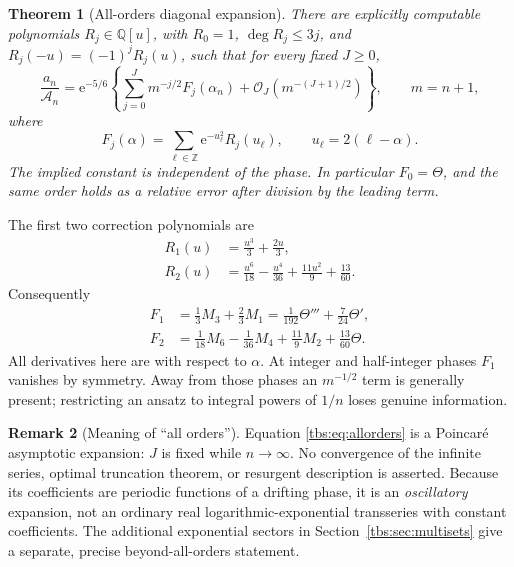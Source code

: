 \documentclass[11pt,a4paper]{article}
\numberwithin{equation}{section}
\newtheorem{theorem}{Theorem}[section]
\theoremstyle{definition}
\newtheorem{remark}[theorem]{Remark}
\newcommand{\Z}{\mathbb Z}
\newcommand{\Acal}{\mathcal A}
\newcommand{\ee}{\mathrm e}
\newcommand{\OO}{\mathcal O}
\begin{document}
\begin{theorem}[All-orders diagonal expansion]\label{tbs:thm:main}
There are explicitly computable polynomials $R_j\in\mathbb Q[u]$, with
$R_0=1$, $\deg R_j\le3j$, and
$R_j(-u)=(-1)^jR_j(u)$, such that for every fixed $J\ge0$,
\begin{equation}\label{tbs:eq:allorders}
 \frac{a_n}{\Acal_n}
 =\ee^{-5/6}\left\{
 \sum_{j=0}^J m^{-j/2}F_j(\alpha_n)
 +\OO_J\!\left(m^{-(J+1)/2}\right)\right\},
 \qquad m=n+1,
\end{equation}
where
\begin{equation}\label{tbs:eq:F}
 F_j(\alpha)=\sum_{\ell\in\Z}\ee^{-u_\ell^2}R_j(u_\ell),
 \qquad u_\ell=2(\ell-\alpha).
\end{equation}
The implied constant is independent of the phase. In particular
$F_0=\Theta$, and the same order holds as a relative error after division
by the leading term.
\end{theorem}

The first two correction polynomials are
\begin{align}
 R_1(u)&=\frac{u^3}{3}+\frac{2u}{3},\label{tbs:eq:R1}\\
 R_2(u)&=\frac{u^6}{18}-\frac{u^4}{36}
            +\frac{11u^2}{9}+\frac{13}{60}.\label{tbs:eq:R2}
\end{align}
Consequently
\begin{align}
 F_1&=\frac13M_3+\frac23M_1
       =\frac1{192}\Theta'''+\frac7{24}\Theta',\label{tbs:eq:F1-derivative}\\
 F_2&=\frac1{18}M_6-\frac1{36}M_4
                   +\frac{11}{9}M_2+\frac{13}{60}\Theta.\label{tbs:eq:F2}
\end{align}
All derivatives here are with respect to $\alpha$.
At integer and half-integer phases $F_1$ vanishes by symmetry. Away from
those phases an $m^{-1/2}$ term is generally present; restricting an ansatz
to integral powers of $1/n$ loses genuine information.

\begin{remark}[Meaning of ``all orders'']
Equation \eqref{tbs:eq:allorders} is a Poincar\'e asymptotic expansion: $J$ is
fixed while $n\to\infty$. No convergence of the infinite series, optimal
truncation theorem, or resurgent description is asserted. Because its
coefficients are periodic functions of a drifting phase, it is an
\emph{oscillatory} expansion, not an ordinary real logarithmic-exponential
transseries with constant coefficients. The additional exponential sectors
in Section~\ref{tbs:sec:multisets} give a separate, precise beyond-all-orders
statement.
\end{remark}
\end{document}
